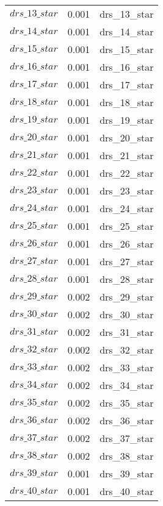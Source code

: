 \begin{center}
\begin{longtable}{ccc}
$drs\_13\_star$ 	 & 	 0.001 	 & 	 drs\_13\_star\\
$drs\_14\_star$ 	 & 	 0.001 	 & 	 drs\_14\_star\\
$drs\_15\_star$ 	 & 	 0.001 	 & 	 drs\_15\_star\\
$drs\_16\_star$ 	 & 	 0.001 	 & 	 drs\_16\_star\\
$drs\_17\_star$ 	 & 	 0.001 	 & 	 drs\_17\_star\\
$drs\_18\_star$ 	 & 	 0.001 	 & 	 drs\_18\_star\\
$drs\_19\_star$ 	 & 	 0.001 	 & 	 drs\_19\_star\\
$drs\_20\_star$ 	 & 	 0.001 	 & 	 drs\_20\_star\\
$drs\_21\_star$ 	 & 	 0.001 	 & 	 drs\_21\_star\\
$drs\_22\_star$ 	 & 	 0.001 	 & 	 drs\_22\_star\\
$drs\_23\_star$ 	 & 	 0.001 	 & 	 drs\_23\_star\\
$drs\_24\_star$ 	 & 	 0.001 	 & 	 drs\_24\_star\\
$drs\_25\_star$ 	 & 	 0.001 	 & 	 drs\_25\_star\\
$drs\_26\_star$ 	 & 	 0.001 	 & 	 drs\_26\_star\\
$drs\_27\_star$ 	 & 	 0.001 	 & 	 drs\_27\_star\\
$drs\_28\_star$ 	 & 	 0.001 	 & 	 drs\_28\_star\\
$drs\_29\_star$ 	 & 	 0.002 	 & 	 drs\_29\_star\\
$drs\_30\_star$ 	 & 	 0.002 	 & 	 drs\_30\_star\\
$drs\_31\_star$ 	 & 	 0.002 	 & 	 drs\_31\_star\\
$drs\_32\_star$ 	 & 	 0.002 	 & 	 drs\_32\_star\\
$drs\_33\_star$ 	 & 	 0.002 	 & 	 drs\_33\_star\\
$drs\_34\_star$ 	 & 	 0.002 	 & 	 drs\_34\_star\\
$drs\_35\_star$ 	 & 	 0.002 	 & 	 drs\_35\_star\\
$drs\_36\_star$ 	 & 	 0.002 	 & 	 drs\_36\_star\\
$drs\_37\_star$ 	 & 	 0.002 	 & 	 drs\_37\_star\\
$drs\_38\_star$ 	 & 	 0.002 	 & 	 drs\_38\_star\\
$drs\_39\_star$ 	 & 	 0.001 	 & 	 drs\_39\_star\\
$drs\_40\_star$ 	 & 	 0.001 	 & 	 drs\_40\_star\\
\bottomrule%
\end{longtable}
\end{center}
